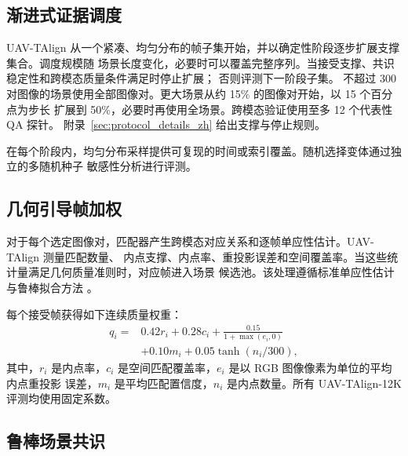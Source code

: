 \subsection{渐进式证据调度}

UAV-TAlign 从一个紧凑、均匀分布的帧子集开始，并以确定性阶段逐步扩展支撑集合。调度规模随
场景长度变化，必要时可以覆盖完整序列。当接受支撑、共识稳定性和跨模态质量条件满足时停止扩展；
否则评测下一阶段子集。
不超过 300 对图像的场景使用全部图像对。更大场景从约 15\% 的图像对开始，以 15 个百分点为步长
扩展到 50\%，必要时再使用全场景。跨模态验证使用至多 12 个代表性 QA 探针。
附录~\ref{sec:protocol_details_zh} 给出支撑与停止规则。

在每个阶段内，均匀分布采样提供可复现的时间或索引覆盖。随机选择变体通过独立的多随机种子
敏感性分析进行评测。

\subsection{几何引导帧加权}

对于每个选定图像对，匹配器产生跨模态对应关系和逐帧单应性估计。UAV-TAlign 测量匹配数量、
内点支撑、内点率、重投影误差和空间覆盖率。当这些统计量满足几何质量准则时，对应帧进入场景
候选池。该处理遵循标准单应性估计与鲁棒拟合方法
\cite{hartley2004multiple,fischler1981ransac,barath2019magsac,barath2020magsacpp}。

每个接受帧获得如下连续质量权重：
\begin{equation}
\begin{aligned}
q_i ={}& 0.42r_i + 0.28c_i + \frac{0.15}{1+\max(e_i,0)} \\
&+ 0.10m_i + 0.05\tanh(n_i/300),
\end{aligned}
\label{eq:frame_quality_zh}
\end{equation}
其中，$r_i$ 是内点率，$c_i$ 是空间匹配覆盖率，$e_i$ 是以 RGB 图像像素为单位的平均内点重投影
误差，$m_i$ 是平均匹配置信度，$n_i$ 是内点数量。所有 UAV-TAlign-12K 评测均使用固定系数。

\subsection{鲁棒场景共识}

